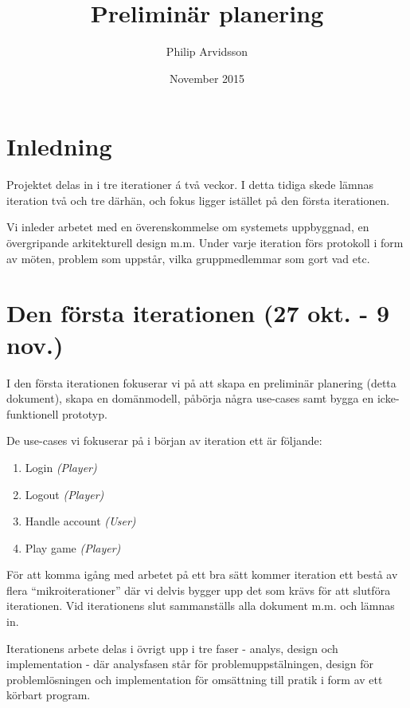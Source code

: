 \documentclass[a4paper]{article}
\title{Preliminär planering}
\author{Philip Arvidsson}
\date{November 2015}
\begin{document}
    \maketitle

    \section{Inledning}
    Projektet delas in i tre iterationer á två veckor. I detta tidiga skede
    lämnas iteration två och tre därhän, och fokus ligger istället på den
    första iterationen.

    Vi inleder arbetet med en överenskommelse om systemets uppbyggnad, en
    övergripande arkitekturell design m.m. Under varje iteration förs protokoll
    i form av möten, problem som uppstår, vilka gruppmedlemmar som gort vad etc.

    \section{Den första iterationen (27 okt. - 9 nov.)}

    I den första iterationen fokuserar vi på att skapa en preliminär planering
    (detta dokument), skapa en domänmodell, påbörja några use-cases samt bygga
    en icke-funktionell prototyp.

    De use-cases vi fokuserar på i början av iteration ett är följande:

    \begin{enumerate}
        \item Login \textit{(Player)}
        \item Logout \textit{(Player)}
        \item Handle account \textit{(User)}
        \item Play game \textit{(Player)}
    \end{enumerate}

    För att komma igång med arbetet på ett bra sätt kommer iteration ett bestå
    av flera ``mikroiterationer'' där vi delvis bygger upp det som krävs för att
    slutföra iterationen. Vid iterationens slut sammanställs alla dokument m.m.
    och lämnas in.

    Iterationens arbete delas i övrigt upp i tre faser - analys, design och
    implementation - där analysfasen står för problemuppstälningen, design för
    problemlösningen och implementation för omsättning till pratik i form av ett
    körbart program.

    \vspace{0.5cm}
\end{document}
